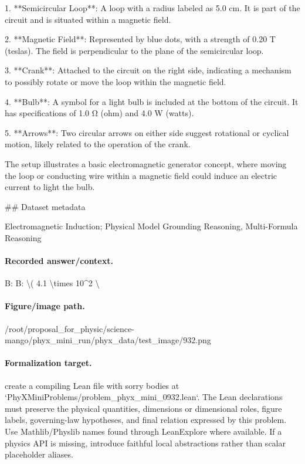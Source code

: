 1. **Semicircular Loop**: A loop with a radius labeled as 5.0 cm. It is part of the circuit and is situated within a magnetic field.

2. **Magnetic Field**: Represented by blue dots, with a strength of 0.20 T (teslas). The field is perpendicular to the plane of the semicircular loop.

3. **Crank**: Attached to the circuit on the right side, indicating a mechanism to possibly rotate or move the loop within the magnetic field.

4. **Bulb**: A symbol for a light bulb is included at the bottom of the circuit. It has specifications of 1.0 Ω (ohm) and 4.0 W (watts).

5. **Arrows**: Two circular arrows on either side suggest rotational or cyclical motion, likely related to the operation of the crank.

The setup illustrates a basic electromagnetic generator concept, where moving the loop or conducting wire within a magnetic field could induce an electric current to light the bulb.

\#\# Dataset metadata

Electromagnetic Induction; Physical Model Grounding Reasoning, Multi-Formula Reasoning

\paragraph{Recorded answer/context.}
B: B: \textbackslash{}( 4.1 \textbackslash{}times 10\textasciicircum{}2 \textbackslash{}

\paragraph{Figure/image path.}
/root/proposal\_for\_physic/science-mango/phyx\_mini\_run/phyx\_data/test\_image/932.png

\paragraph{Formalization target.}
create a compiling Lean file with sorry bodies at `PhyXMiniProblems/problem\_phyx\_mini\_0932.lean`. The Lean declarations must preserve the physical quantities, dimensions or dimensional roles, figure labels, governing-law hypotheses, and final relation expressed by this problem.
Use Mathlib/Physlib names found through LeanExplore where available. If a physics API is missing, introduce faithful local abstractions rather than scalar placeholder aliases.

